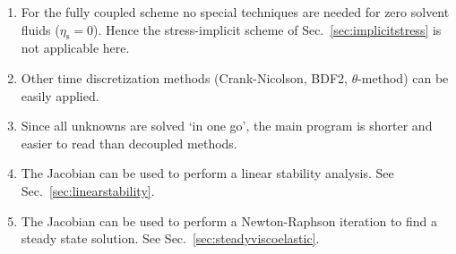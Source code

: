 \begin{enumerate}
\[
   \begin{pmatrix}
     E & F & 0 & 0 \\
    F^T & S & L & B_1 \\
    0 & L^T & 0 & 0 \\
    G_1 & C_1 & 0 & D_1
    \end{pmatrix}
\]
which extends to
\[
   \begin{pmatrix}
     E & F & 0 & 0 & 0 & \cdots & 0 \\
     F^T & S & L & B_1 & B_2 & \cdots & B_m \\
     0 & L^T & 0 & 0 & 0 & \cdots & 0 \\
     G_1 & C_1 & 0 & D_1 & 0 & \cdots & 0 \\
     G_2 & C_2 & 0 & 0 & D_2 & \cdots & 0 \\
      \vdots &\vdots  & \vdots & \vdots & \vdots & \ddots & \vdots \\
     G_m & C_m& 0 & 0 & 0& \cdots & D_m \\
    \end{pmatrix}
\]
assuming $m$ modes are used in the constitutive equation and that these are not coupled.
\item For the fully coupled scheme no special techniques are needed for zero solvent fluids ($\eta_\text{s}=0$). Hence the stress-implicit scheme of Sec.~\ref{sec:implicitstress} is not applicable here.
\item Other time discretization methods (Crank-Nicolson, BDF2, $\theta$-method)
 can be easily applied.
 \item Since all unknowns are solved `in one go', the main program is shorter and easier to read than decoupled methods.
\item The Jacobian can be used to perform a linear stability analysis. See Sec.~\ref{sec:linearstability}.
\item The Jacobian can be used to perform a Newton-Raphson iteration to find a steady state solution. See Sec.~\ref{sec:steadyviscoelastic}.
\end{enumerate}

